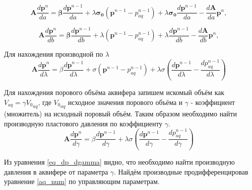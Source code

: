 \documentclass[14pt]{article}
\begin{document}
\begin{equation} \label{eq_dp_da}
\boldsymbol{A}\frac{d\boldsymbol{p}^n}{da} = \boldsymbol{\beta}\frac{d\boldsymbol{p}^{n-1}}{da} + \lambda\boldsymbol{\sigma_0}(\boldsymbol{p}^{n-1}-p_{aq}^{n-1})+\lambda\boldsymbol{\sigma_0}\frac{d\boldsymbol{p}^{n-1}}{da}-\frac{d\boldsymbol{A}}{da}\boldsymbol{p}^n,
\end{equation}

\begin{equation} \label{eq_dp_db}
\boldsymbol{A}\frac{d\boldsymbol{p}^n}{db} = \boldsymbol{\beta}\frac{d\boldsymbol{p}^{n-1}}{db} + \lambda(\boldsymbol{p}^{n-1}-p_{aq}^{n-1})+\lambda\frac{d\boldsymbol{p}^{n-1}}{db}-\frac{d\boldsymbol{A}}{db}\boldsymbol{p}^n,
\end{equation}

Для нахождения производной по $ \lambda $
\begin{equation} \label{rp}
\boldsymbol{A}\frac{d\boldsymbol{p}^n}{d\lambda} = \beta\frac{d\boldsymbol{p}^{n-1}}{d\lambda} + \sigma(\boldsymbol{p}^{n-1}-p_{aq}^{n-1})+\lambda\sigma(\frac{d\boldsymbol{p}^{n-1}}{d\lambda}-\frac{dp_{aq}^{n-1}}{d\lambda})
\end{equation}

 Для нахождения порового объёма аквифера запишем искомый объём как $ V_{aq} = \gamma{V_0}_{aq}$, где $ {V_0}_{aq} $ исходное значения порового объёма и $ \gamma $ - коэффициент (множитель) на исходный поровый объём. Таким образом необходимо найти производную пластового давления по коэффициенту $ \gamma $.
\begin{equation} \label{eq_dp_dgamma}
\boldsymbol{A}\frac{d\boldsymbol{p}^n}{d\gamma} = \beta\frac{d\boldsymbol{p}^{n-1}}{d\gamma} + \lambda\sigma(\frac{d\boldsymbol{p}^{n-1}}{d\gamma}-\frac{dp_{aq}^{n-1}}{d\gamma})
\end{equation}

Из уравнения \ref{eq_dp_dgamma} видно, что необходимо найти производную давления в аквифере от параметра $ \gamma $. Найдём производные продифференцировав уравнение \ref{aq_num} по управляющим параметрам.
\end{document}
